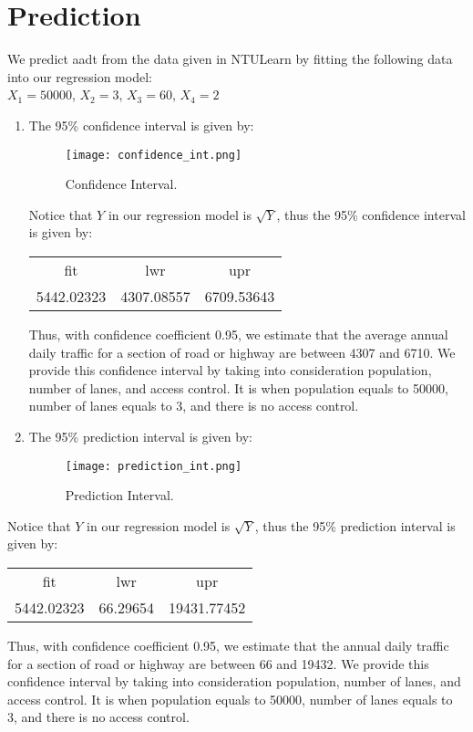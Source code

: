 \documentclass[english]{article}
\begin{document}
\section{Prediction}
We predict aadt from the data given in NTULearn by fitting the following data into our regression model: \\
$X_1 = 50000$, $X_2 = 3$, $X_3 = 60$, $X_4 = 2$ \\

\begin{enumerate}\itemsep0pt

\item The 95\% confidence interval is given by: 

    \begin{figure}[H]
    	\begin{centering}
      		\texttt{[image: confidence\_int.png]}
      		\caption{Confidence Interval. \label{figure12}
    }
    	\end{centering}
    \end{figure}
Notice that $Y$ in our regression model is $\sqrt{Y}$, thus the 95\% confidence interval is given by: 

\begin{center}
\begin{tabular}{ c c c }
 fit & lwr & upr \\ 
 5442.02323 & 4307.08557 & 6709.53643
\end{tabular}
\end{center}

Thus, with confidence coefficient 0.95, we estimate that the average annual daily traffic for a section of road or highway are between 4307 and 6710. We provide this confidence interval by taking into consideration population, number of lanes, and access control. It is when population equals to 50000, number of lanes equals to 3, and there is no access control. 

\item The 95\% prediction interval is given by:

\begin{figure}[H]
    	\begin{centering}
      		\texttt{[image: prediction\_int.png]}
      		\caption{Prediction Interval. \label{figure13}
    }
    	\end{centering}
    \end{figure}
\end{enumerate}

Notice that $Y$ in our regression model is $\sqrt{Y}$, thus the 95\% prediction interval is given by: 
\begin{center}
\begin{tabular}{ c c c }
 fit & lwr & upr \\ 
 5442.02323 & 66.29654 & 19431.77452
\end{tabular}
\end{center}
Thus, with confidence coefficient 0.95, we estimate that the annual daily traffic for a section of road or highway are between 66 and 19432. We provide this confidence interval by taking into consideration population, number of lanes, and access control. It is when population equals to 50000, number of lanes equals to 3, and there is no access control. 
\end{document}
